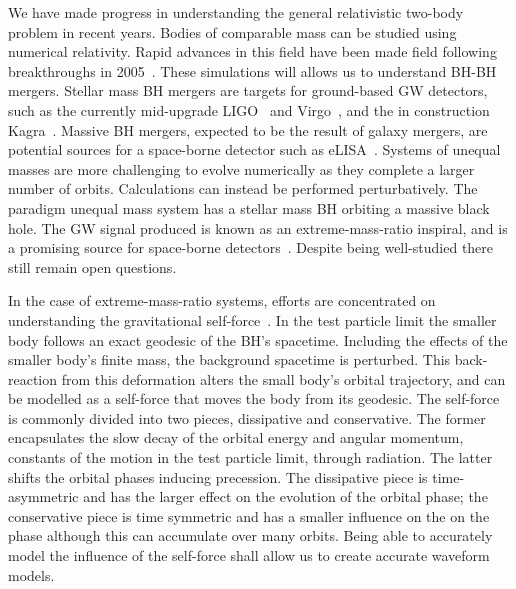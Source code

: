 \documentclass[aps,prd,amsfonts,amssymb,amsmath,nofootinbib,reprint,showpacs]{revtex4-1}
\begin{document}
We have made progress in understanding the general relativistic two-body problem in recent years. Bodies of comparable mass can be studied using numerical relativity. Rapid advances in this field have been made field following breakthroughs in 2005~\cite{Pretorius2005,Campanelli2006,Baker2006}. These simulations will allows us to understand BH-BH mergers. Stellar mass BH mergers are targets for ground-based GW detectors, such as the currently mid-upgrade LIGO~\cite{Harry2010} and Virgo~\cite{Accadia2011}, and the in construction Kagra~\cite{Kuroda2010}. Massive BH mergers, expected to be the result of galaxy mergers, are potential sources for a space-borne detector such as eLISA~\cite{Amaro-Seoane2012a}. Systems of unequal masses are more challenging to evolve numerically as they complete a larger number of orbits. Calculations can instead be performed perturbatively. The paradigm unequal mass system has a stellar mass BH orbiting a massive black hole. The GW signal produced is known as an extreme-mass-ratio inspiral, and is a promising source for space-borne detectors~\cite{Amaro-Seoane2007}. Despite being well-studied there still remain open questions.

In the case of extreme-mass-ratio systems, efforts are concentrated on understanding the gravitational self-force~\cite{Barack2009,Poisson2004}. In the test particle limit the smaller body follows an exact geodesic of the BH's spacetime. Including the effects of the smaller body's finite mass, the background spacetime is perturbed. This back-reaction from this deformation alters the small body's orbital trajectory, and can be modelled as a self-force that moves the body from its geodesic. The self-force is commonly divided into two pieces, dissipative and conservative. The former encapsulates the slow decay of the orbital energy and angular momentum, constants of the motion in the test particle limit, through radiation. The latter shifts the orbital phases inducing precession. The dissipative piece is time-asymmetric and has the larger effect on the evolution of the orbital phase; the conservative piece is time symmetric and has a smaller influence on the on the phase although this can accumulate over many orbits. Being able to accurately model the influence of the self-force shall allow us to create accurate waveform models.
\end{document}
